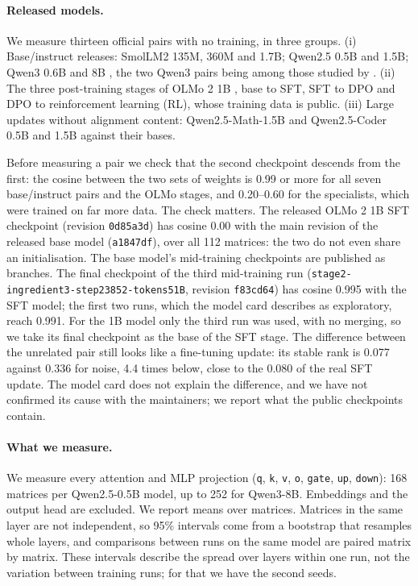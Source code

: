 \paragraph{Released models.} We measure thirteen official pairs with no
training, in three groups. (i) Base/instruct releases: SmolLM2 135M, 360M and
1.7B; Qwen2.5 0.5B and 1.5B; Qwen3 0.6B and 8B \citep{yang2025qwen3}, the two
Qwen3 pairs being among those studied by \citet{wu2025timber}. (ii) The three
post-training stages of OLMo 2 1B \citep{olmo2024olmo2}, base to SFT, SFT to
DPO and DPO to reinforcement learning (RL), whose training data is public.
(iii) Large updates without
alignment content: Qwen2.5-Math-1.5B \citep{yang2024qwenmath} and
Qwen2.5-Coder 0.5B and 1.5B \citep{hui2024qwencoder} against their bases.

Before measuring a pair we check that the second checkpoint descends from the
first: the cosine between the two sets of weights is 0.99 or more for all
seven base/instruct pairs and the OLMo stages, and 0.20--0.60 for the
specialists, which were trained on far more data. The check matters. The
released OLMo 2 1B SFT checkpoint (revision \texttt{0d85a3d}) has cosine
0.00 with the main revision of the released base model (\texttt{a1847df}),
over all 112 matrices: the two do not even share an initialisation. The base
model's mid-training checkpoints are published as branches. The final
checkpoint of the third mid-training run
(\texttt{stage2-ingredient3-step23852-tokens51B}, revision \texttt{f83cd64})
has cosine 0.995 with the SFT model; the first two runs, which the model card
describes as exploratory, reach 0.991. For the 1B model only the third run was used, with
no merging, so we take its final checkpoint as the base of the SFT stage. The
difference between the unrelated pair still looks like a fine-tuning update:
its stable rank is 0.077 against 0.336 for noise, 4.4 times below, close to
the 0.080 of the real SFT update. The model card does not explain the
difference, and we have not confirmed its cause with the maintainers; we
report what the public checkpoints contain.

\paragraph{What we measure.} We measure every attention and MLP projection
(\texttt{q}, \texttt{k}, \texttt{v}, \texttt{o}, \texttt{gate}, \texttt{up},
\texttt{down}): 168 matrices per Qwen2.5-0.5B model, up to 252 for Qwen3-8B.
Embeddings and the output head are excluded. We report means over matrices.
Matrices in the same layer are not independent, so 95\% intervals come from a
bootstrap that resamples whole layers, and comparisons between runs on the
same model are paired matrix by matrix. These intervals describe the spread
over layers within one run, not the variation between training runs; for
that we have the second seeds.
